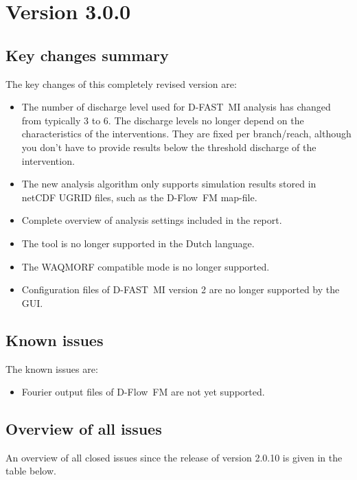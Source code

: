 \documentclass[git]{deltares_manual}
\newcommand{\dfmi}{\textrm{D-FAST~MI}\xspace}
\newcommand{\dflowfm}{\textrm{D-Flow~FM}\xspace}
\begin{document}
\section{Version 3.0.0}

\subsection{Key changes summary}
The key changes of this completely revised version are:

\begin{itemize}
\item The number of discharge level used for \dfmi analysis has changed from typically 3 to 6.
The discharge levels no longer depend on the characteristics of the interventions.
They are fixed per branch/reach, although you don't have to provide results below the threshold discharge of the intervention.
\item The new analysis algorithm only supports simulation results stored in netCDF UGRID files, such as the \dflowfm map-file.
\item Complete overview of analysis settings included in the report.
\item The tool is no longer supported in the Dutch language.
\item The WAQMORF compatible  mode is no longer supported.
\item Configuration files of \dfmi version 2 are no longer supported by the GUI.
\end{itemize}

\subsection{Known issues}

The known issues are:

\begin{itemize}
\item Fourier output files of \dflowfm are not yet supported.
\end{itemize}

\subsection{Overview of all issues}

An overview of all closed issues since the release of version 2.0.10 is given in the table below.
\end{document}
